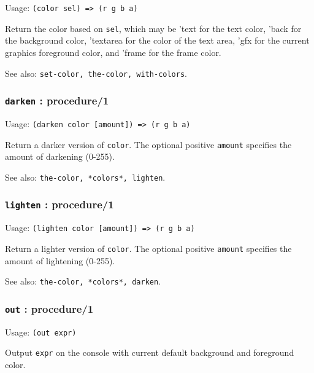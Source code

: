 \documentclass[
]{article}
\newcommand{\passthrough}[1]{#1}
\begin{document}
Usage: \passthrough{\lstinline!(color sel) => (r g b a)!}

Return the color based on \passthrough{\lstinline!sel!}, which may be
'text for the text color, 'back for the background color, 'textarea for
the color of the text area, 'gfx for the current graphics foreground
color, and 'frame for the frame color.

See also: \passthrough{\lstinline!set-color, the-color, with-colors!}.

\hypertarget{darken-procedure1}{%
\subsubsection{\texorpdfstring{\texttt{darken} :
procedure/1}{darken : procedure/1}}\label{darken-procedure1}}

Usage: \passthrough{\lstinline!(darken color [amount]) => (r g b a)!}

Return a darker version of \passthrough{\lstinline!color!}. The optional
positive \passthrough{\lstinline!amount!} specifies the amount of
darkening (0-255).

See also: \passthrough{\lstinline!the-color, *colors*, lighten!}.

\hypertarget{lighten-procedure1}{%
\subsubsection{\texorpdfstring{\texttt{lighten} :
procedure/1}{lighten : procedure/1}}\label{lighten-procedure1}}

Usage: \passthrough{\lstinline!(lighten color [amount]) => (r g b a)!}

Return a lighter version of \passthrough{\lstinline!color!}. The
optional positive \passthrough{\lstinline!amount!} specifies the amount
of lightening (0-255).

See also: \passthrough{\lstinline!the-color, *colors*, darken!}.

\hypertarget{out-procedure1}{%
\subsubsection{\texorpdfstring{\texttt{out} :
procedure/1}{out : procedure/1}}\label{out-procedure1}}

Usage: \passthrough{\lstinline!(out expr)!}

Output \passthrough{\lstinline!expr!} on the console with current
default background and foreground color.
\end{document}
